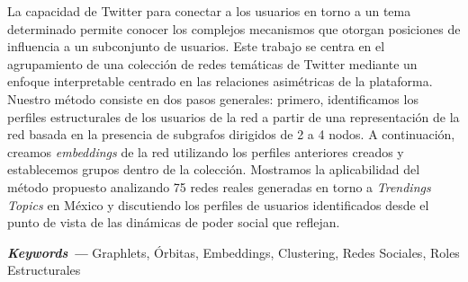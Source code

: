 \label{sec:abstract}

La capacidad de Twitter para conectar a los usuarios en torno a un tema determinado permite conocer los complejos mecanismos que otorgan posiciones de influencia a un subconjunto de usuarios. Este trabajo se centra en el agrupamiento de una colección de redes temáticas de Twitter mediante un enfoque interpretable centrado en las relaciones asimétricas de la plataforma. Nuestro método consiste en dos pasos generales: primero, identificamos los perfiles estructurales de los usuarios de la red a partir de una representación de la red basada en la presencia de subgrafos dirigidos de 2 a 4 nodos. A continuación, creamos \textit{embeddings} de la red utilizando los perfiles anteriores creados y establecemos grupos dentro de la colección. Mostramos la aplicabilidad del método propuesto analizando 75 redes reales generadas en torno a \textit{Trendings Topics} en México y discutiendo los perfiles de usuarios identificados desde el punto de vista de las dinámicas de poder social que reflejan.

{\vspace{5mm}\textbf{\textit{Keywords ---}} Graphlets, Órbitas, Embeddings, Clustering, Redes Sociales, Roles Estructurales} 